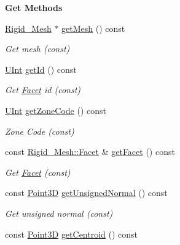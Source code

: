 \begin{Indent}{\bf Get Methods}\par
\begin{DoxyCompactItemize}
\item 
\hyperlink{classFVCode3D_1_1Rigid__Mesh}{Rigid\+\_\+\+Mesh} $\ast$ \hyperlink{classFVCode3D_1_1Rigid__Mesh_1_1Facet__ID_a7c8237fc0d6d1706deef2dcd872b4480}{get\+Mesh} () const 
\begin{DoxyCompactList}\small\item\em Get mesh (const) \end{DoxyCompactList}\item 
\hyperlink{namespaceFVCode3D_a4bf7e328c75d0fd504050d040ebe9eda}{U\+Int} \hyperlink{classFVCode3D_1_1Rigid__Mesh_1_1Facet__ID_acf00cdd98ae92a84d82754d0d9878b64}{get\+Id} () const 
\begin{DoxyCompactList}\small\item\em Get \hyperlink{classFVCode3D_1_1Rigid__Mesh_1_1Facet}{Facet} id (const) \end{DoxyCompactList}\item 
\hyperlink{namespaceFVCode3D_a4bf7e328c75d0fd504050d040ebe9eda}{U\+Int} \hyperlink{classFVCode3D_1_1Rigid__Mesh_1_1Facet__ID_a8d919b6e5346d36ca71604f0c37cd277}{get\+Zone\+Code} () const 
\begin{DoxyCompactList}\small\item\em Zone Code (const) \end{DoxyCompactList}\item 
const \hyperlink{classFVCode3D_1_1Rigid__Mesh_1_1Facet}{Rigid\+\_\+\+Mesh\+::\+Facet} \& \hyperlink{classFVCode3D_1_1Rigid__Mesh_1_1Facet__ID_a555b0572de3f638b2537de9a790bbc38}{get\+Facet} () const 
\begin{DoxyCompactList}\small\item\em Get \hyperlink{classFVCode3D_1_1Rigid__Mesh_1_1Facet}{Facet} (const) \end{DoxyCompactList}\item 
const \hyperlink{classFVCode3D_1_1Point3D}{Point3D} \hyperlink{classFVCode3D_1_1Rigid__Mesh_1_1Facet__ID_a20ee7f532091bf919c6bad0797221336}{get\+Unsigned\+Normal} () const 
\begin{DoxyCompactList}\small\item\em Get unsigned normal (const) \end{DoxyCompactList}\item 
const \hyperlink{classFVCode3D_1_1Point3D}{Point3D} \hyperlink{classFVCode3D_1_1Rigid__Mesh_1_1Facet__ID_afd11bc5dcc915bbe6a9c39f333e336ff}{get\+Centroid} () const 

\end{DoxyCompactItemize}
\end{Indent}
